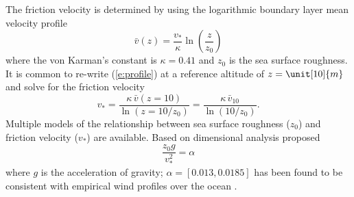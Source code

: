\documentclass[utf8]{frontiersSCNS} %
\begin{document}
The friction velocity is determined by using the logarithmic boundary layer mean velocity profile
\begin{equation}
\bar{v}(z) = \frac{v_*}{\kappa}\ln{\left(\frac{z}{z_0}\right)}
\label{e:profile}
\end{equation}
where the von Karman's constant is $\kappa=0.41$ and $z_0$ is the sea surface roughness.  It is common to re-write (\ref{e:profile}) at a reference altitude of $z=\unit[10]{m}$ and solve for the friction velocity
\begin{equation}
v_* = \frac{\kappa \, \bar{v}(z=10)}{\ln(z=10/z_0)} = \frac{\kappa \, \bar{v}_{10}}{\ln(10/z_0)}.
\label{e:profile10}
\end{equation}
Multiple models of the relationship between sea surface roughness ($z_0$) and friction velocity ($v_*$) are available.  Based on dimensional analysis \citet{charnock55wind} proposed 
\begin{equation}
\frac{z_0 g }{v_*^2} = \alpha
\label{e:charnock}
\end{equation}
where $g$ is the acceleration of gravity; $\alpha = [0.013, 0.0185]$ has been found to be consistent with empirical wind profiles over the ocean \citep{garratt77review,toba90wave}.  %
\end{document}
